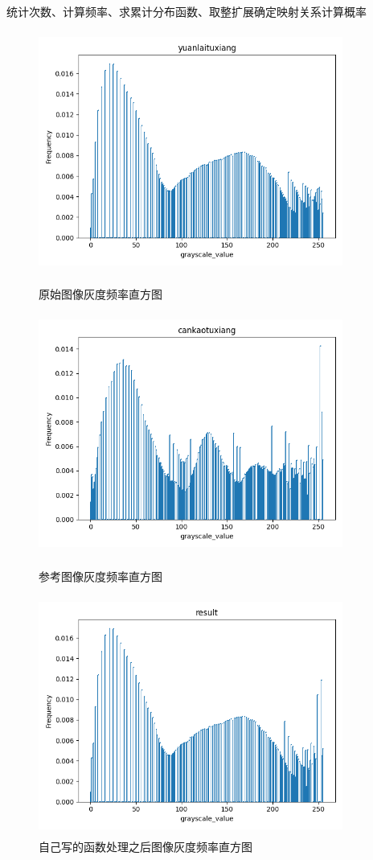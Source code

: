 \documentclass{article}
\begin{document}
   统计次数、计算频率、求累计分布函数、取整扩展确定映射关系计算概率
   \begin{figure}[h!]
                \centering
                \includegraphics[width=10cm,height=7.9cm]{xuan20.png}
                \caption{原始图像灰度频率直方图}
                \includegraphics[width=10cm,height=7.9cm]{xuan30.png}
                \caption{参考图像灰度频率直方图}
                \includegraphics[width=10cm,height=7.9cm]{xuan50.png}
                \caption{自己写的函数处理之后图像灰度频率直方图}
                \end{figure}
\clearpage
\newpage
\end{document}
